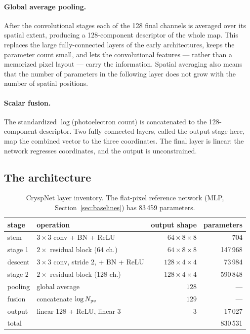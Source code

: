 \documentclass[11pt,a4paper]{article}
\begin{document}
\paragraph{Global average pooling.} After the convolutional stages each of the
128 final channels is averaged over its spatial extent, producing a
128-component descriptor of the whole map. This replaces the large
fully-connected layers of the early architectures, keeps the parameter count
small, and lets the convolutional features --- rather than a memorized pixel
layout --- carry the information. Spatial averaging also means that the number of
parameters in the following layer does not grow with the number of spatial positions.

\paragraph{Scalar fusion.} The standardized $\log$(photoelectron count) is
concatenated to the 128-component descriptor. Two fully connected layers, called the
output stage here, map the combined vector to the three coordinates. The final layer is linear:
the network regresses coordinates, and the output is unconstrained.

\subsection{The architecture}

\begin{table}[htbp]
\centering
\begin{tabular}{llrr}
  \toprule
  stage & operation & output shape & parameters \\
  \midrule
  stem    & $3\times3$ conv + BN + ReLU            & $64\times8\times8$  & 704 \\
  stage 1 & $2\times$ residual block (64 ch.)      & $64\times8\times8$  & 147\,968 \\
  descent & $3\times3$ conv, stride 2, + BN + ReLU & $128\times4\times4$ & 73\,984 \\
  stage 2 & $2\times$ residual block (128 ch.)     & $128\times4\times4$ & 590\,848 \\
  pooling & global average                          & $128$               & --- \\
  fusion  & concatenate $\log N_{\rm pe}$           & $129$               & --- \\
  output  & linear 128 + ReLU, linear 3            & $3$                 & 17\,027 \\
  \midrule
  total   &                                         &                     & 830\,531 \\
  \bottomrule
\end{tabular}
\caption{CryspNet layer inventory. The flat-pixel reference network (MLP,
Section~\ref{sec:baselines}) has 83\,459 parameters.}
\label{tab:arch}
\end{table}
\end{document}
